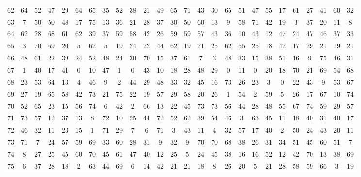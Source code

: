\begin{table}
\begin{tabular}{c c c c c c c c c c c c c c c c c c c c c c c c c c }
62 & 64 & 52 & 47 & 29 & 64 & 65 & 35 & 52 & 38 & 21 & 49 & 65 & 71 & 43 & 30 & 65 & 51 & 47 & 55 & 17 & 61 & 27 & 41 & 60 & 32 \\
63 & 7 & 50 & 50 & 48 & 17 & 75 & 13 & 36 & 21 & 28 & 37 & 30 & 50 & 60 & 13 & 9 & 58 & 71 & 42 & 19 & 3 & 37 & 20 & 11 & 8 \\
64 & 62 & 28 & 68 & 61 & 62 & 39 & 37 & 59 & 58 & 42 & 26 & 59 & 59 & 57 & 43 & 36 & 10 & 43 & 12 & 47 & 24 & 47 & 46 & 37 & 33 \\
65 & 3 & 70 & 69 & 20 & 5 & 62 & 5 & 19 & 24 & 22 & 44 & 62 & 19 & 21 & 25 & 62 & 55 & 25 & 18 & 42 & 17 & 29 & 21 & 19 & 21 \\
66 & 48 & 61 & 22 & 39 & 24 & 52 & 48 & 24 & 30 & 70 & 15 & 37 & 61 & 7 & 3 & 48 & 33 & 15 & 38 & 51 & 16 & 9 & 75 & 46 & 31 \\
67 & 1 & 40 & 17 & 41 & 0 & 10 & 47 & 1 & 0 & 43 & 10 & 18 & 28 & 48 & 29 & 0 & 11 & 0 & 20 & 18 & 70 & 21 & 69 & 54 & 68 \\
68 & 23 & 53 & 64 & 13 & 4 & 46 & 9 & 2 & 44 & 29 & 48 & 33 & 32 & 45 & 16 & 73 & 26 & 23 & 3 & 0 & 22 & 43 & 9 & 53 & 67 \\
69 & 27 & 19 & 65 & 58 & 42 & 73 & 21 & 75 & 22 & 19 & 57 & 29 & 58 & 20 & 26 & 1 & 54 & 2 & 59 & 5 & 26 & 17 & 67 & 10 & 74 \\
70 & 52 & 65 & 23 & 15 & 56 & 74 & 6 & 42 & 2 & 66 & 13 & 22 & 45 & 73 & 73 & 56 & 44 & 28 & 48 & 55 & 67 & 74 & 59 & 29 & 57 \\
71 & 73 & 57 & 12 & 37 & 13 & 8 & 72 & 10 & 25 & 44 & 72 & 52 & 62 & 39 & 54 & 46 & 3 & 63 & 45 & 11 & 18 & 40 & 31 & 40 & 17 \\
72 & 46 & 32 & 11 & 23 & 15 & 1 & 71 & 29 & 7 & 6 & 71 & 3 & 43 & 11 & 4 & 32 & 57 & 17 & 40 & 2 & 50 & 24 & 43 & 20 & 11 \\
73 & 71 & 7 & 24 & 57 & 59 & 69 & 33 & 60 & 28 & 31 & 9 & 32 & 9 & 70 & 70 & 68 & 38 & 26 & 31 & 34 & 51 & 45 & 60 & 51 & 7 \\
74 & 8 & 27 & 25 & 45 & 60 & 70 & 45 & 61 & 47 & 40 & 12 & 25 & 5 & 24 & 45 & 38 & 16 & 16 & 52 & 12 & 42 & 70 & 13 & 38 & 69 \\
75 & 6 & 37 & 28 & 18 & 2 & 63 & 44 & 69 & 6 & 14 & 42 & 21 & 21 & 18 & 8 & 26 & 20 & 5 & 21 & 28 & 58 & 59 & 66 & 3 & 19 \\
\hline
\end{tabular}
\end{table}